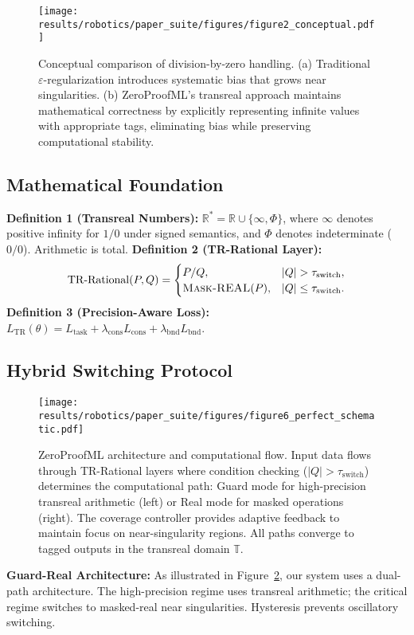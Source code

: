\documentclass[twoside,11pt]{article}
\newcommand{\RR}{\mathbb{R}}
\newcommand{\maskreal}{\textsc{Mask-REAL}}
\begin{document}
\begin{figure}[t]
\centering
\texttt{[image: results/robotics/paper\_suite/figures/figure2\_conceptual.pdf]}
\caption{Conceptual comparison of division-by-zero handling. (a) Traditional $\varepsilon$-regularization introduces systematic bias that grows near singularities. (b) ZeroProofML's transreal approach maintains mathematical correctness by explicitly representing infinite values with appropriate tags, eliminating bias while preserving computational stability.}
\label{fig:conceptual}
\end{figure}

\subsection{Mathematical Foundation}
\textbf{Definition 1 (Transreal Numbers):} $\RR^\ast=\RR\cup\{\infty,\Phi\}$, where $\infty$ denotes positive infinity for $1/0$ under signed semantics, and $\Phi$ denotes indeterminate ($0/0$). Arithmetic is total.
\newline
\textbf{Definition 2 (TR-Rational Layer):}
\[\mathrm{TR\text{-}Rational}(P,Q)=
\begin{cases}
P/Q, & |Q|>\tau_{\mathrm{switch}},\\
\maskreal(P), & |Q|\le \tau_{\mathrm{switch}}.
\end{cases}\]
\textbf{Definition 3 (Precision-Aware Loss):} $L_{\mathrm{TR}}(\theta)=L_{\mathrm{task}}+\lambda_{\mathrm{cons}}L_{\mathrm{cons}}+\lambda_{\mathrm{bnd}}L_{\mathrm{bnd}}$.
\subsection{Hybrid Switching Protocol}

\begin{figure}[t]
\centering
\texttt{[image: results/robotics/paper\_suite/figures/figure6\_perfect\_schematic.pdf]}
\caption{ZeroProofML architecture and computational flow. Input data flows through TR-Rational layers where condition checking ($|Q| > \tau_{\text{switch}}$) determines the computational path: Guard mode for high-precision transreal arithmetic (left) or Real mode for masked operations (right). The coverage controller provides adaptive feedback to maintain focus on near-singularity regions. All paths converge to tagged outputs in the transreal domain $\mathbb{T}$.}
\label{fig:zeroproofml_schematic}
\end{figure}

\textbf{Guard-Real Architecture:} As illustrated in Figure~\ref{fig:zeroproofml_schematic}, our system uses a dual-path architecture. The high-precision regime uses transreal arithmetic; the critical regime switches to masked-real near singularities. Hysteresis prevents oscillatory switching. 
\end{document}

